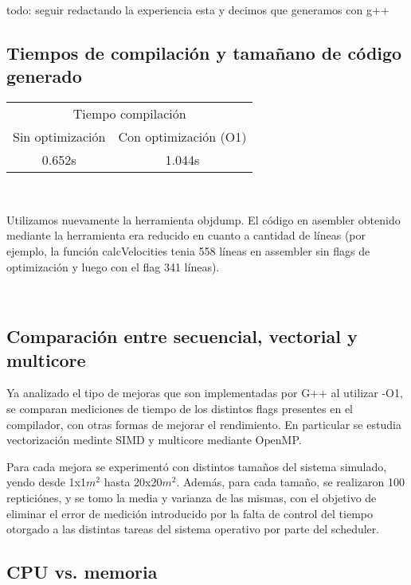 todo: seguir redactando la experiencia esta
y decimos que generamos con g++

\subsection{Tiempos de compilación y tamañano de código generado}

\begin{center}
	\begin{tabular}{cc}  
		\toprule 
		\multicolumn{2}{c}{Tiempo compilación} \\
		\cmidrule(r){1-2}
		Sin optimización & Con optimización (O1) \\
		\midrule
		0.652s	&	1.044s	\\
		\bottomrule
	\end{tabular}\\
\end{center}


Utilizamos nuevamente la herramienta objdump. El código en asembler obtenido mediante la herramienta era reducido en cuanto a cantidad de líneas (por ejemplo, la función calcVelocities tenia 558 líneas en assembler sin flags de optimización y luego con el flag 341 líneas).

~\\



\subsection{Comparación entre secuencial, vectorial y multicore}
Ya analizado el tipo de mejoras que son implementadas por G++ al utilizar -O1, se comparan mediciones de tiempo de los distintos flags presentes en el compilador, con otras formas de mejorar el rendimiento. En particular se estudia vectorización medinte SIMD y multicore mediante OpenMP.

Para cada mejora se experimentó con distintos tamaños del sistema simulado, yendo desde 1x1$m^2$ hasta 20x20$m^2$. Además, para cada tamaño, se realizaron 100 repticiónes, y se tomo la media y varianza de las mismas, con el objetivo de eliminar el error de medición introducido por la falta de control del tiempo otorgado a las distintas tareas del sistema operativo por parte del scheduler.



\subsection{CPU vs. memoria}

